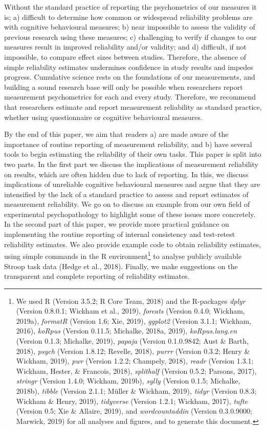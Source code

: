 \documentclass[english,,man,floatsintext]{apa6}
\let\rmarkdownfootnote\footnote%
\def\footnote{\protect\rmarkdownfootnote}
\begin{document}
Without the standard practice of reporting the psychometrics of our measures it is; a) difficult to determine how common or widespread reliability problems are with cognitive behavioural measures; b) near impossible to assess the validity of previous research using these measures; c) challenging to verify if changes to our measures result in improved reliability and/or validity; and d) difficult, if not impossible, to compare effect sizes between studies. Therefore, the absence of simple reliability estimates undermines confidence in study results and impedes progress. Cumulative science rests on the foundations of our measurements, and building a sound research base will only be possible when researchers report measurement psychometrics for each and every study. Therefore, we recommend that researchers estimate and report measurement reliability as standard practice, whether using questionnaire or cognitive behavioural measures.

By the end of this paper, we aim that readers a) are made aware of the importance of routine reporting of measurement reliability, and b) have several tools to begin estimating the reliability of their own tasks. This paper is split into two parts. In the first part we discuss the implications of measurement reliability on results, which are often hidden due to lack of reporting. In this, we discuss implications of unreliable cognitive behavioural measures and argue that they are intensified by the lack of a standard practice to assess and report estimates of measurement reliability. We go on to discuss an example from our own field of experimental psychopathology to highlight some of these issues more concretely. In the second part of this paper, we provide more practical guidance on implementing the routine reporting of internal consistency and test-retest reliability estimates. We also provide example code to obtain reliability estimates, using simple commands in the R environment\footnote{We used R (Version 3.5.2; R Core Team, 2018) and the R-packages \emph{dplyr} (Version 0.8.0.1; Wickham et al., 2019), \emph{forcats} (Version 0.4.0; Wickham, 2019a), \emph{formatR} (Version 1.6; Xie, 2019), \emph{ggplot2} (Version 3.1.1; Wickham, 2016), \emph{koRpus} (Version 0.11.5; Michalke, 2018a, 2019), \emph{koRpus.lang.en} (Version 0.1.3; Michalke, 2019), \emph{papaja} (Version 0.1.0.9842; Aust \& Barth, 2018), \emph{psych} (Version 1.8.12; Revelle, 2018), \emph{purrr} (Version 0.3.2; Henry \& Wickham, 2019), \emph{pwr} (Version 1.2.2; Champely, 2018), \emph{readr} (Version 1.3.1; Wickham, Hester, \& Francois, 2018), \emph{splithalf} (Version 0.5.2; Parsons, 2017), \emph{stringr} (Version 1.4.0; Wickham, 2019b), \emph{sylly} (Version 0.1.5; Michalke, 2018b), \emph{tibble} (Version 2.1.1; Müller \& Wickham, 2019), \emph{tidyr} (Version 0.8.3; Wickham \& Henry, 2019), \emph{tidyverse} (Version 1.2.1; Wickham, 2017), \emph{tufte} (Version 0.5; Xie \& Allaire, 2019), and \emph{wordcountaddin} (Version 0.3.0.9000; Marwick, 2019) for all analyses and figures, and to generate this document.} to analyse publicly available Stroop task data (Hedge et al., 2018). Finally, we make suggestions on the transparent and complete reporting of reliability estimates.
\end{document}
